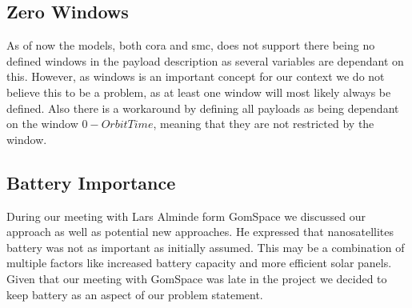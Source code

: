 \subsection*{Zero Windows}
As of now the models, both \gls{cora} and \gls{smc}, does not support there being no defined windows in the payload description as several variables are dependant on this. However, as windows is an important concept for our context we do not believe this to be a problem, as at least one window will most likely always be defined. Also there is a workaround by defining all payloads as being dependant on the window $0-OrbitTime$, meaning that they are not restricted by the window.

\subsection*{Battery Importance}
During our meeting with Lars Alminde form GomSpace we discussed our approach as well as potential new approaches. He expressed that nanosatellites battery was not as important as initially assumed\cite{gom_space_conversation}. This may be a combination of multiple factors like increased battery capacity and more efficient solar panels. Given that our meeting with GomSpace was late in the project we decided to keep battery as an aspect of our problem statement.


